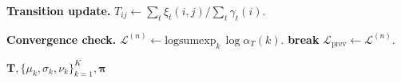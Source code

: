 \begin{algorithm}[tp]
\begin{algorithmic}[1]
    \STATE \textbf{Transition update.} $T_{ij} \leftarrow \sum_t \xi_t(i,j) / \sum_t \gamma_t(i)$.

    \STATE \textbf{Convergence check.} $\mathcal{L}^{(n)} \leftarrow \text{logsumexp}_k\, \log \alpha_T(k)$.  \STATE \textbf{break} \ENDIF
    \STATE $\mathcal{L}_{\text{prev}} \leftarrow \mathcal{L}^{(n)}$.
\ENDFOR

\RETURN $\mathbf{T}, \{\mu_k, \sigma_k, \nu_k\}_{k=1}^K, \boldsymbol{\pi}$
\end{algorithmic}
\end{algorithm}

